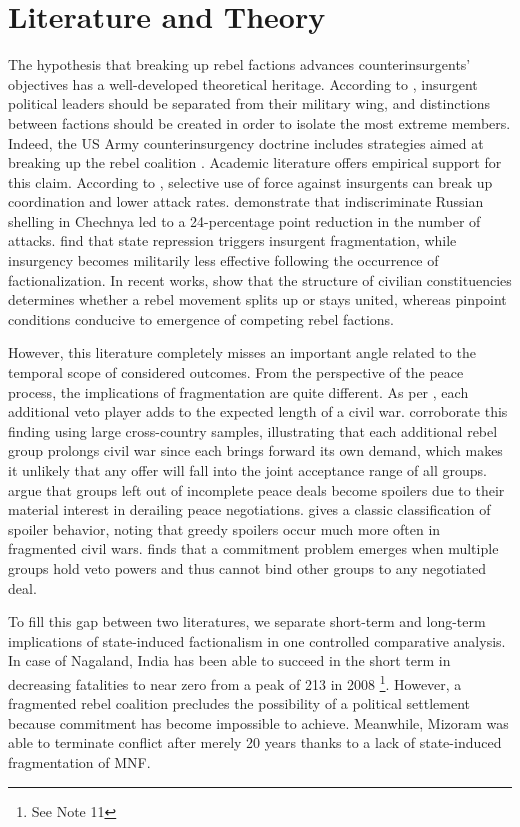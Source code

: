 \documentclass[12pt,a4paper]{article}
\begin{document}
\section{Literature and Theory}

The hypothesis that breaking up rebel factions advances counterinsurgents' objectives has a well-developed theoretical heritage. According to \citet{galula1964}, insurgent political leaders should be separated from their military wing, and distinctions between factions should be created in order to isolate the most extreme members. Indeed, the US Army counterinsurgency doctrine includes strategies aimed at breaking up the rebel coalition \citep{fm324}. Academic literature offers empirical support for this claim. According to \citet{kalyvas2006}, selective use of force against insurgents can break up coordination and lower attack rates. \citet{lyall2009} demonstrate that indiscriminate Russian shelling in Chechnya led to a 24-percentage point reduction in the number of attacks. \citet{fjelde2012} find that state repression triggers insurgent fragmentation, while insurgency becomes militarily less effective following the occurrence of factionalization. In recent works, \citet{mosinger2018} show that the structure of civilian constituencies determines whether a rebel movement splits up or stays united, whereas \citet{fjelde2018} pinpoint conditions conducive to emergence of competing rebel factions.

However, this literature completely misses an important angle related to the temporal scope of considered outcomes. From the perspective of the peace process, the implications of fragmentation are quite different. As per \citet{cunningham2006}, each additional veto player adds to the expected length of a civil war. \citet{cunningham2009} corroborate this finding using large cross-country samples, illustrating that each additional rebel group prolongs civil war since each brings forward its own demand, which makes it unlikely that any offer will fall into the joint acceptance range of all groups. \citet{nilsson2008} argue that groups left out of incomplete peace deals become spoilers due to their material interest in derailing peace negotiations. \citet{stedman1997} gives a classic classification of spoiler behavior, noting that greedy spoilers occur much more often in fragmented civil wars. \citet{walter2002} finds that a commitment problem emerges when multiple groups hold veto powers and thus cannot bind other groups to any negotiated deal.

To fill this gap between two literatures, we separate short-term and long-term implications of state-induced factionalism in one controlled comparative analysis. In case of Nagaland, India has been able to succeed in the short term in decreasing fatalities to near zero from a peak of 213 in 2008 \footnote{See Note 11}. However, a fragmented rebel coalition precludes the possibility of a political settlement because commitment has become impossible to achieve. Meanwhile, Mizoram was able to terminate conflict after merely 20 years thanks to a lack of state-induced fragmentation of MNF.
\end{document}
